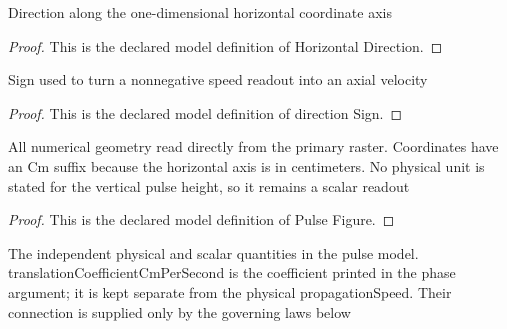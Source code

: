 \begin{definition}
  \label{def:physics:phyx-mini-0301:phyxminiproblems-problemphyxmini0301-horizontaldirection}
  Direction along the one-dimensional horizontal coordinate axis
\end{definition}
\begin{proof}
  This is the declared model definition of Horizontal Direction.
\end{proof}
\begin{definition}
  \label{def:physics:phyx-mini-0301:phyxminiproblems-problemphyxmini0301-directionsign}
  Sign used to turn a nonnegative speed readout into an axial velocity
\end{definition}
\begin{proof}
  This is the declared model definition of direction Sign.
\end{proof}
\begin{definition}
  \label{def:physics:phyx-mini-0301:phyxminiproblems-problemphyxmini0301-pulsefigure}
  All numerical geometry read directly from the primary raster. Coordinates have an Cm suffix because the horizontal axis is in centimeters. No physical unit is stated for the vertical pulse height, so it remains a scalar readout
\end{definition}
\begin{proof}
  This is the declared model definition of Pulse Figure.
\end{proof}
\begin{definition}
  \label{def:physics:phyx-mini-0301:phyxminiproblems-problemphyxmini0301-travelingpulsesetup}
  The independent physical and scalar quantities in the pulse model. translationCoefficientCmPerSecond is the coefficient printed in the phase argument; it is kept separate from the physical propagationSpeed. Their connection is supplied only by the governing laws below
\end{definition}
